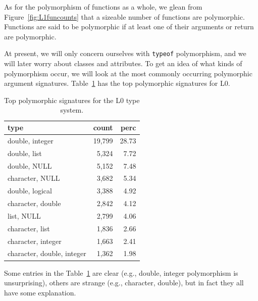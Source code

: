 \documentclass[acmsmall,10pt,review,anonymous]{acmart}\settopmatter{printfolios=true,printccs=false,printacmref=false}
\newcommand{\code}[1]{\lstinline|#1|\xspace}
\begin{document}
As for the polymorphism of functions as a whole, we glean from Figure~\ref{fig:L1funcounts} that a sizeable number of functions are polymorphic.
Functions are said to be polymorphic if at least one of their arguments or return are polymorphic.

At present, we will only concern ourselves with \code{typeof} polymorphism, and we will later worry about classes and attributes.
To get an idea of what kinds of polymorphism occur, we will look at the most commonly occurring polymorphic argument signatures.
Table~\ref{tab:L1toppoly} has the top polymorphic signatures for L0.

\begin{table}[ht]
\label{tab:L1toppoly}
\centering
\begin{tabular}{lrr}
  \hline
type & count & perc \\ 
  \hline
  double, integer & 19,799 & 28.73 \\ 
  double, list & 5,324 & 7.72 \\ 
  double, NULL & 5,152 & 7.48 \\ 
  character, NULL & 3,682 & 5.34 \\ 
  double, logical & 3,388 & 4.92 \\ 
  character, double & 2,842 & 4.12 \\ 
  list, NULL & 2,799 & 4.06 \\ 
  character, list & 1,836 & 2.66 \\ 
  character, integer & 1,663 & 2.41 \\ 
  character, double, integer & 1,362 & 1.98 \\ 
   \hline
\end{tabular}
\caption{Top polymorphic signatures for the L0 type system.}
\end{table}

Some entries in the Table~\ref{tab:L1toppoly} are clear (e.g., double, integer polymorphism is unsurprising), others are strange (e.g., character, double), but in fact they all have some explanation.
\end{document}
